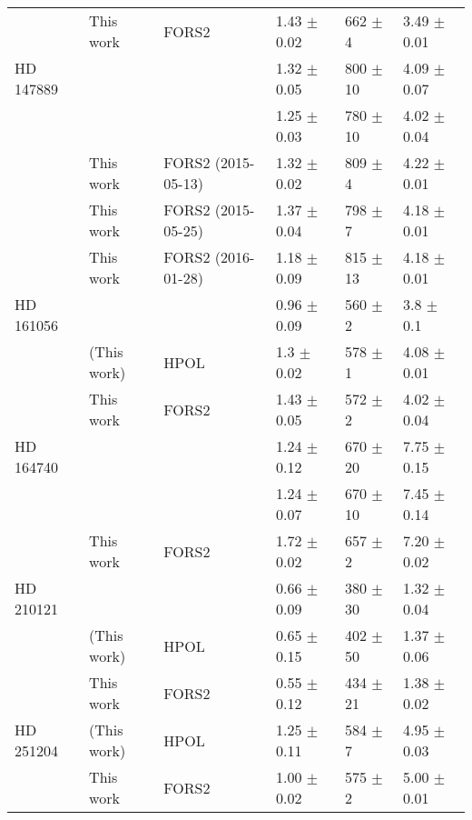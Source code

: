 \begin{table*}[h]
\begin{tabular}{llllll}
          & This work        &FORS2         & 1.43 $\pm$ 0.02 &  662 $\pm$  4  & 3.49 $\pm$ 0.01   \\ [2mm]
HD 147889 & \citet{Wiletal80}&              & 1.32 $\pm$ 0.05 &  800 $\pm$ 10  & 4.09 $\pm$ 0.07   \\  
          & \citet{Maretal92}&              & 1.25 $\pm$ 0.03 &  780 $\pm$ 10  & 4.02 $\pm$ 0.04   \\
          & This work   &FORS2 (2015-05-13) & 1.32 $\pm$ 0.02 &  809 $\pm$  4  & 4.22 $\pm$ 0.01   \\
          & This work   &FORS2 (2015-05-25) & 1.37 $\pm$ 0.04 &  798 $\pm$  7  & 4.18 $\pm$ 0.01   \\
          & This work   &FORS2 (2016-01-28) & 1.18 $\pm$ 0.09 &  815 $\pm$ 13  & 4.18 $\pm$ 0.01   \\ [2mm]
HD 161056 & \citet{Wiletal80}&              & 0.96 $\pm$ 0.09 &  560 $\pm$  2  & 3.8  $\pm$ 0.1    \\
          &  (This work)     &HPOL          & 1.3  $\pm$ 0.02 &  578 $\pm$  1  & 4.08 $\pm$ 0.01   \\
          & This work        &FORS2         & 1.43 $\pm$ 0.05 &  572 $\pm$  2  & 4.02 $\pm$ 0.04   \\ [2mm]
HD 164740 &\citet{Wiletal82} &              & 1.24 $\pm$ 0.12 &  670 $\pm$ 20  & 7.75 $\pm$ 0.15   \\ 
          & \citet{Maretal92}&              & 1.24 $\pm$ 0.07 &  670 $\pm$ 10  & 7.45 $\pm$ 0.14   \\
          & This work        &FORS2         & 1.72 $\pm$ 0.02 &  657 $\pm$  2  & 7.20 $\pm$ 0.02   \\ [2mm]
HD 210121 & \citet{Larson99} &              & 0.66 $\pm$ 0.09 &  380 $\pm$ 30  & 1.32 $\pm$ 0.04   \\ %
          &  (This work)     &HPOL          & 0.65 $\pm$ 0.15 &  402 $\pm$ 50  & 1.37 $\pm$ 0.06   \\%
          & This work        &FORS2         & 0.55 $\pm$ 0.12 &  434 $\pm$ 21  & 1.38 $\pm$ 0.02   \\ [2mm]
HD 251204 &  (This work)     &HPOL          & 1.25 $\pm$ 0.11 &  584 $\pm$  7  & 4.95 $\pm$ 0.03   \\
          & This work        &FORS2         & 1.00 $\pm$ 0.02 &  575 $\pm$  2  & 5.00 $\pm$ 0.01   \\ 

\hline
\end{tabular}
\end{table*}


